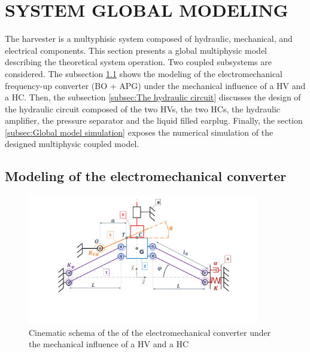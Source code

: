 \documentclass[3p,twocolumn,preprint]{elsarticle}
\begin{document}
\section{SYSTEM GLOBAL MODELING}
\label{sec:SYSTEM MODELING}
The harvester is a multyphisic system composed of hydraulic, mechanical, and electrical components. This section presents a global multiphysic model describing the theoretical system operation. Two coupled subsystems are considered. The subsection \ref{subsec:The electromechanical converter} shows the modeling of the electromechanical frequency-up converter (BO + APG) under the mechanical influence of a HV and a HC. Then, the subsection \ref{subsec:The hydraulic circuit} discusses the design of the hydraulic circuit composed of the two HVs, the two HCs, the hydraulic amplifier, the pressure separator and the liquid filled earplug. Finally, the section \ref{subsec:Global model simulation} exposes the numerical simulation of the designed multiphysic coupled model.

	\subsection{Modeling of the electromechanical converter}	
	\label{subsec:The electromechanical converter}
\begin{figure}[!htbp]
	\centering
	\captionsetup{justification=centering}
	\includegraphics[trim={0cm 0cm 0cm 0cm},clip, width=0.9\textwidth]{figures/schema_cinematique1.pdf}
	\caption{Cinematic schema of the of the electromechanical converter under the mechanical influence of a HV and a HC}
	\label{fig:schema_cinematique1}
\end{figure}
\end{document}
